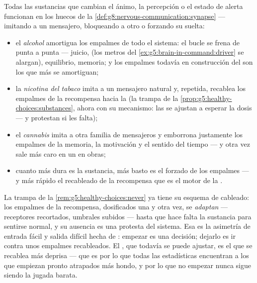 \begin{proposition}\label{prop:g8:protecting-the-nervous-system:substances}
Todas las sustancias que cambian el ánimo, la percepción o el estado de
alerta funcionan en los huecos de la
\cref{def:g8:nervous-communication:synapse} --- imitando a un
mensajero, bloqueando a otro o forzando su suelta:
\begin{itemize}
  \item el \emph{alcohol} amortigua los empalmes de todo el sistema: el
        bucle se frena de punta a punta --- juicio, 
        (los metros del \cref{ex:g5:brain-in-command:driver} se
        alargan), equilibrio, memoria; y los empalmes todavía en
        construcción del   son los que más se
        amortiguan;
  \item la \emph{nicotina del tabaco} imita a un mensajero natural y,
        repetida, recablea los empalmes de la recompensa hacia la
        \emph{} (la trampa de la
        \cref{prop:g5:healthy-choices:substances}, ahora con su
        mecanismo: las  se ajustan a esperar la dosis --- y
        protestan si les falta);
  \item el \emph{cannabis} imita a otra familia de mensajeros y
        emborrona justamente los empalmes de la memoria, la motivación
        y el sentido del tiempo --- y otra vez sale más caro en un
         en obras;
  \item cuanto más dura es la sustancia, más basto es el forzado de los
        empalmes --- y más rápido el recableado de la recompensa que es
        el motor de la .
\end{itemize}
\end{proposition}
\admitted

\begin{remark}\label{rem:g8:protecting-the-nervous-system:addiction}
La trampa de la \cref{rem:g5:healthy-choices:never} ya tiene su esquema
de cableado: los empalmes de la recompensa, dosificados una y otra vez,
se \emph{adaptan} --- receptores recortados, umbrales subidos --- hasta
que hace falta la sustancia para sentirse normal, y su ausencia es una
protesta del sistema. Esa  es la asimetría de entrada fácil y
salida difícil hecha de : empezar es una decisión; dejarlo es
ir contra unos empalmes recableados. El  , que
todavía se puede ajustar, es el que se recablea más deprisa --- que es
por lo que todas las estadísticas encuentran a los que empiezan pronto
atrapados más hondo, y por lo que no empezar nunca sigue siendo la
jugada barata.
\end{remark}

